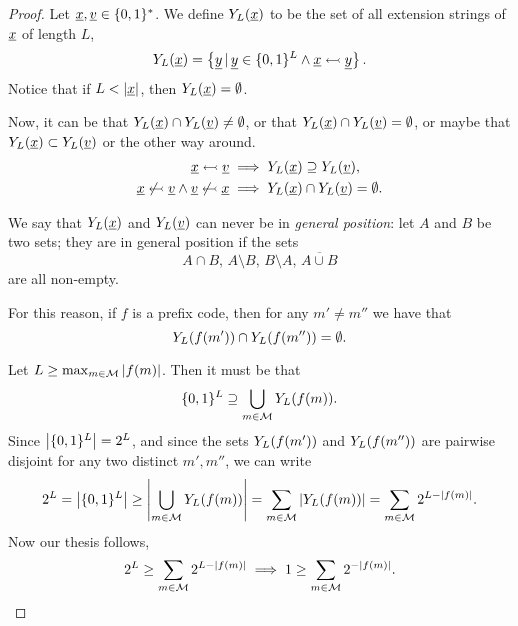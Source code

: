 \begin{proof}
	Let $\underline{x}, \underline{v} \in \{0, 1\}^*$.
	We define $Y_L(\underline{x})$ to be the set of all extension strings of $\underline{x}$ of length $L$, \ie
	\begin{equation*}
		Y_L(\underline{x}) = \left\{\underline{y} \, | \, \underline{y} \in \{0, 1\}^L \land \underline{x} \leftarrowtail \underline{y} \right\}.
	\end{equation*}
	Notice that if $L < \left|{\underline{x}}\right|$, then $Y_L(\underline{x}) = \emptyset$.

	Now, it can be that $Y_L(\underline{x}) \cap Y_L(\underline{v}) \neq \emptyset$, or that $Y_L(\underline{x}) \cap Y_L(\underline{v}) = \emptyset$, or maybe that $Y_L(\underline{x}) \subset Y_L(\underline{v})$ or the other way around.
	\begin{align*}
		\underline{x} \leftarrowtail \underline{v} & \implies Y_L(\underline{x}) \supseteq Y_L(\underline{v}),
		\\
		\underline{x} \not\leftarrowtail \underline{v} \land \underline{v} \not\leftarrowtail \underline{x} & \implies Y_L(\underline{x}) \cap Y_L(\underline{v}) = \emptyset.
	\end{align*}

	We say that $Y_L(\underline{x})$ and $Y_L(\underline{v})$ can never be in \emph{general position}: let $A$ and  $B$ be two sets; they are in general position if the sets
	\begin{equation*}
		A \cap B, \, A \setminus B, \, B \setminus A, \, \overline{A \cup B}
	\end{equation*}
	are all non-empty.

	For this reason, if $f$ is a prefix code, then for any $m' \neq m''$ we have that
	\begin{equation*}
		Y_L(f(m')) \cap Y_L(f(m'')) = \emptyset.
	\end{equation*}

	Let $L \ge \max_{m \in \mathcal{M}} \left|{f(m)}\right|$.
	Then it must be that
	\begin{equation*}
		\{0, 1\}^L \supseteq \bigcup_{m \in \mathcal{M}} Y_L(f(m)).
	\end{equation*}
	Since $\left|{\{0, 1\}^L}\right| = 2^L$, and since the sets $Y_L(f(m'))$ and $Y_L(f(m''))$ are pairwise disjoint for any two distinct $m', m''$, we can write
	\begin{equation*}
		2^L
		=
		\left|{\{0, 1\}^L}\right|
		\ge
		\left|{\bigcup_{m \in \mathcal{M}} Y_L(f(m))}\right|
		=
		\sum_{m \in \mathcal{M}} \left|{Y_L(f(m))}\right|
		=
		\sum_{m \in \mathcal{M}} 2^{L - \left|{f(m)}\right|}.
	\end{equation*}
	Now our thesis follows, \ie
	\begin{equation*}
		2^L \ge \sum_{m \in \mathcal{M}} 2^{L - \left|{f(m)}\right|}
		\implies
		1 \ge \sum_{m \in \mathcal{M}} 2^{-\left|{f(m)}\right|}. \qedhere
	\end{equation*}
\end{proof}

